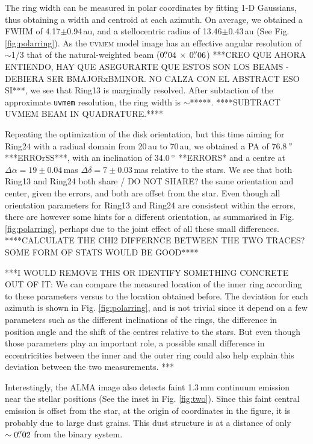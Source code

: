 \documentclass[letters,usenatbib,times]{mnras}
\begin{document}
The ring width can be measured in polar coordinates by fitting 1-D Gaussians, thus  obtaining a width and centroid at each azimuth. On average, we obtained  a FWHM of 4.17$\pm$0.94\,au, and a stellocentric radius of  13.46$\pm$0.43\,au  (See Fig. \ref{fig:polarring}). As the \textsc{uvmem} model image has an effective angular resolution of $\sim$1/3 that of the natural-weighted beam ($0\hbox{$.\!\!^{\prime\prime}$}04 \,\times \, 0\hbox{$.\!\!^{\prime\prime}$}06$) ***CREO QUE AHORA ENTIENDO, HAY QUE ASEGURARTE QUE ESTOS SON LOS BEAMS - DEBIERA SER BMAJORxBMINOR. NO CALZA CON EL ABSTRACT ESO SI***, we see that Ring13 is marginally resolved. After subtaction of the approximate {\tt uvmem} resolution, the ring width is $\sim$*****. 
****SUBTRACT UVMEM BEAM IN QUADRATURE.****


Repeating the optimization of the disk orientation, but  this time aiming for Ring24  with a radiual domain from 20\,au to 70\,au, we obtained a  PA of 76.8\,$\hbox{$^\circ$}$ ***ERROrSS***, with an inclination of 34.0\,$\hbox{$^\circ$}$ **ERRORS* and a centre at $\Delta \alpha = 19\pm0.04$\,mas $\Delta \delta = 7\pm0.03$\,mas relative to the stars. We see that both Ring13 and Ring24  both share / DO NOT SHARE? the same orientation and center, given the errors, and both are offset from the star. Even though all orientation parameters for Ring13 and Ring24  are consistent within the errors, there  are however some hints for a different orientation, as summarised in Fig. \ref{fig:polarring}, perhaps due to the joint effect of all these small differences. ****CALCULATE THE CHI2 DIFFERNCE BETWEEN THE TWO TRACES? SOME FORM OF STATS WOULD BE GOOD**** 


***I WOULD REMOVE THIS OR IDENTIFY SOMETHING CONCRETE OUT OF IT: We can compare the measured location of the inner ring according to  these parameters versus to the location obtained before. The deviation for each azimuth is shown in Fig. \ref{fig:polarring}, and is not trivial since it depend on a few parameters such as the different inclinations of the rings, the difference in position angle and the shift of the centres relative to the stars. But even though those parameters play an important role, a possible small difference in eccentricities between the inner and the outer ring could also help explain this deviation between the two measurements. ***



Interestingly, the ALMA image also detects faint 1.3\,mm continuum emission near the stellar positions (See the inset in Fig. \ref{fig:two}). Since this faint central emission is offset from the star, at the origin of coordinates in the figure, it is probably due to large dust grains. This dust structure is at a distance of only $\sim0\hbox{$.\!\!^{\prime\prime}$}02$ from the binary system.
\end{document}

